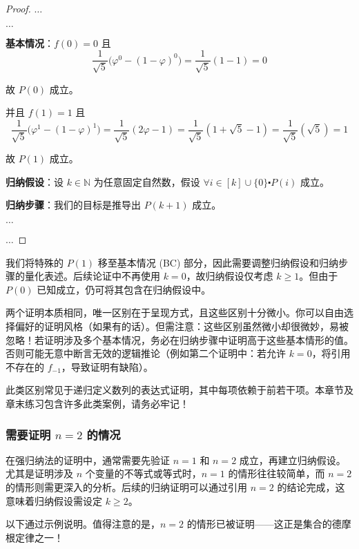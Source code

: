 \begin{proof}

    $\dots$

    $\dots$

    \textbf{基本情况}：$f(0) = 0$ 且
    \[\frac{1}{\sqrt{5}}\big(\varphi^0-(1-\varphi)^0\big) = \frac{1}{\sqrt{5}} (1-1) = 0\]

    故 $P(0)$ 成立。

    并且 $f(1) = 1$ 且
    \[\frac{1}{\sqrt{5}}\big(\varphi^1-(1-\varphi)^1\big) = \frac{1}{\sqrt{5}} (2\varphi-1) = \frac{1}{\sqrt{5}} (1+\sqrt{5}-1) = \frac{1}{\sqrt{5}} (\sqrt{5}) = 1\]
    
    故 $P(1)$ 成立。

    \textbf{归纳假设}：设 $k \in \mathbb{N}$ 为任意固定自然数，假设 $\forall i \in [k] \cup \{0\} \centerdot P(i)$ 成立。

    \textbf{归纳步骤}：我们的目标是推导出 $P(k+1)$ 成立。

    $\dots$

    $\dots$
\end{proof}

我们将特殊的 $P(1)$ 移至基本情况 (BC) 部分，因此需要调整归纳假设和归纳步骤的量化表述。后续论证中不再使用 $k = 0$，故归纳假设仅考虑 $k \ge 1$。但由于 $P(0)$ 已知成立，仍可将其包含在归纳假设中。

两个证明本质相同，唯一区别在于呈现方式，且这些区别十分微小。你可以自由选择偏好的证明风格（如果有的话）。但需注意：这些区别虽然微小却很微妙，易被忽略！若证明涉及多个基本情况，务必在归纳步骤中证明高于这些基本情形的值。否则可能无意中断言无效的逻辑推论（例如第二个证明中：若允许 $k=0$，将引用不存在的 $f_{-1}$，导致证明有缺陷）。

此类区别常见于递归定义数列的表达式证明，其中每项依赖于前若干项。本章节及章末练习包含许多此类案例，请务必牢记！

\subsubsection*{需要证明 $n=2$ 的情况}

在强归纳法的证明中，通常需要先验证 $n = 1$ 和 $n = 2$ 成立，再建立归纳假设。尤其是证明涉及 $n$ 个变量的不等式或等式时，$n = 1$ 的情形往往较简单，而 $n = 2$ 的情形则需更深入的分析。后续的归纳证明可以通过引用 $n = 2$ 的结论完成，这意味着归纳假设需设定 $k \ge 2$。

以下通过示例说明。值得注意的是，$n = 2$ 的情形已被证明——这正是集合的德摩根定律之一！\\

